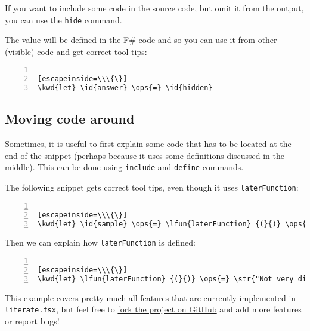\documentclass{article}
\newcommand{\id}[1]{\textcolor{black}{#1}}
\newcommand{\kwd}[1]{\textcolor{navy}{#1}}
\newcommand{\ops}[1]{\textcolor{purple}{#1}}
\newcommand{\str}[1]{\textcolor{olive}{#1}}
\begin{document}
If you want to include some code in the source code,
but omit it from the output, you can use the \texttt{hide}
command.


The value will be defined in the F\# code and so you
can use it from other (visible) code and get correct
tool tips:
\begin{lstlisting}[numbers=left]

[escapeinside=\\\{\}]
\kwd{let} \id{answer} \ops{=} \id{hidden}

\end{lstlisting}

\subsection*{Moving code around}



Sometimes, it is useful to first explain some code that
has to be located at the end of the snippet (perhaps
because it uses some definitions discussed in the middle).
This can be done using \texttt{include} and \texttt{define} commands.


The following snippet gets correct tool tips, even though
it uses \texttt{laterFunction}:
\begin{lstlisting}[numbers=left]

[escapeinside=\\\{\}]
\kwd{let} \id{sample} \ops{=} \lfun{laterFunction} {(}{)} \ops{|>} \lfun{printfn} \str{"Got: }\lprf{\%s}\str{"}

\end{lstlisting}



Then we can explain how \texttt{laterFunction} is defined:
\begin{lstlisting}[numbers=left]

[escapeinside=\\\{\}]
\kwd{let} \lfun{laterFunction} {(}{)} \ops{=} \str{"Not very difficult, is it?"}

\end{lstlisting}



This example covers pretty much all features that are
currently implemented in \texttt{literate.fsx}, but feel free
to \href{https://github.com/fsprojects/FSharp.Formatting}{fork the project on GitHub} and add more
features or report bugs!
\end{document}
